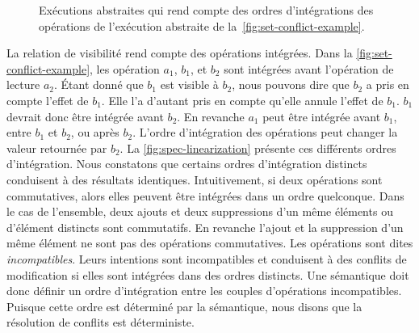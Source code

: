 \begin{figure}[htb]
\begin{subfigure}{\linewidth}
    \caption{}
\end{subfigure}
\caption[Impact d'ordres distincts d'intégration des messages sur un ensemble répliqué]{Exécutions abstraites qui rend compte des ordres d'intégrations des opérations de l'exécution abstraite de la~\autoref{fig:set-conflict-example}.}\label{fig:spec-linearization}
\end{figure}

La relation de visibilité rend compte des opérations intégrées.
Dans la \autoref{fig:set-conflict-example}, les opération $a_1$, $b_1$, et $b_2$ sont intégrées avant l'opération de lecture $a_2$.
Étant donné que $b_1$ est visible à $b_2$, nous pouvons dire que $b_2$ a pris en compte l'effet de $b_1$.
Elle l'a d'autant pris en compte qu'elle annule l'effet de $b_1$.
$b_1$ devrait donc être intégrée avant $b_2$.
En revanche $a_1$ peut être intégrée avant $b_1$, entre $b_1$ et $b_2$, ou après $b_2$.
L'ordre d'intégration des opérations peut changer la valeur retournée par $b_2$.
La \autoref{fig:spec-linearization} présente ces différents ordres d'intégration.
Nous constatons que certains ordres d'intégration distincts conduisent à des résultats identiques.
Intuitivement, si deux opérations sont commutatives, alors elles peuvent être intégrées dans un ordre quelconque.
Dans le cas de l'ensemble, deux ajouts et deux suppressions d'un même éléments ou d'élément distincts sont commutatifs.
En revanche l'ajout et la suppression d'un même élément ne sont pas des opérations commutatives.
Les opérations sont dites \emph{incompatibles}.
Leurs intentions sont incompatibles et conduisent à des conflits de modification si elles sont intégrées dans des ordres distincts.
Une sémantique doit donc définir un ordre d'intégration entre les couples d'opérations incompatibles.
Puisque cette ordre est déterminé par la sémantique, nous disons que la résolution de conflits est déterministe.

